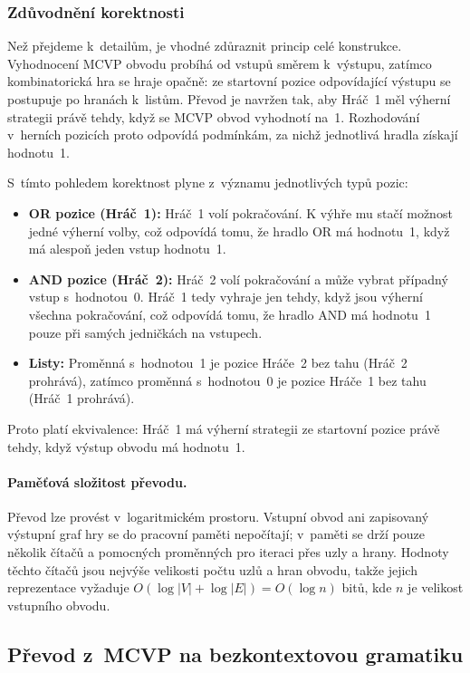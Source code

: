 \subsubsection*{Zdůvodnění korektnosti}
Než přejdeme k~detailům, je vhodné zdůraznit princip celé konstrukce. Vyhodnocení MCVP obvodu probíhá od vstupů směrem k~výstupu, zatímco kombinatorická hra se hraje opačně: ze startovní pozice odpovídající výstupu se postupuje po hranách k~listům. Převod je navržen tak, aby Hráč~1 měl výherní strategii právě tehdy, když se MCVP obvod vyhodnotí na~1. Rozhodování v~herních pozicích proto odpovídá podmínkám, za nichž jednotlivá hradla získají hodnotu~1.

S~tímto pohledem korektnost plyne z~významu jednotlivých typů pozic:

\begin{itemize}
    \item \textbf{OR pozice (Hráč~1):} Hráč~1 volí pokračování. K výhře mu stačí možnost jedné výherní volby, což odpovídá tomu, že hradlo OR má hodnotu~1, když má alespoň jeden vstup hodnotu~1.
    \item \textbf{AND pozice (Hráč~2):} Hráč~2 volí pokračování a může vybrat případný vstup s~hodnotou~0. Hráč~1 tedy vyhraje jen tehdy, když jsou výherní všechna pokračování, což odpovídá tomu, že hradlo AND má hodnotu~1 pouze při samých jedničkách na vstupech.
    \item \textbf{Listy:} Proměnná s~hodnotou~1 je pozice Hráče~2 bez tahu (Hráč~2 prohrává), zatímco proměnná s~hodnotou~0 je pozice Hráče~1 bez tahu (Hráč~1 prohrává).
\end{itemize}

Proto platí ekvivalence: Hráč~1 má výherní strategii ze startovní pozice právě tehdy, když výstup obvodu má hodnotu~1.

\paragraph{Paměťová složitost převodu.}
Převod lze provést v~logaritmickém prostoru. Vstupní obvod ani zapisovaný výstupní graf hry se do pracovní paměti nepočítají; v~paměti se drží pouze několik čítačů a pomocných proměnných pro iteraci přes uzly a hrany. Hodnoty těchto čítačů jsou nejvýše velikosti počtu uzlů a hran obvodu, takže jejich reprezentace vyžaduje $O(\log |V| + \log |E|)=O(\log n)$ bitů, kde $n$ je velikost vstupního obvodu.

\subsection{Převod z~MCVP na bezkontextovou gramatiku}
\label{sec:TheoryReductionToGrammar}


